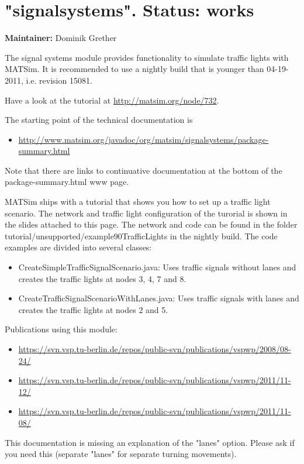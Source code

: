 \vfill\eject
\section{"signalsystems". Status: works}

\textbf{Maintainer:} Dominik Grether

The signal systems module provides functionality to simulate traffic  lights with MATSim. It is recommended to use a nightly build that is  younger than 04-19-2011, i.e. revision 15081.

Have a look at the tutorial at \href{http://matsim.org/node/732}{http://matsim.org/node/732}.

The starting point of the technical documentation is
\begin{itemize}
	\item \href{http://www.matsim.org/javadoc/org/matsim/signalsystems/package-summary.html}{http://www.matsim.org/javadoc/org/matsim/signalsystems/package-summary.html}
\end{itemize}

Note that there are links to continuative documentation at the bottom of the package-summary.html www page.

MATSim ships with a tutorial that shows you how to set up a traffic  light scenario. The network and traffic light configuration of the  turorial is shown in the slides attached to this page. The network and  code can be found in the folder  tutorial/unsupported/example90TrafficLights in the nightly build. The  code examples are divided into several classes:
\begin{itemize}
	\item CreateSimpleTrafficSignalScenario.java: Uses traffic signals  without lanes and creates the traffic lights at nodes 3, 4, 7 and 8.
	\item CreateTrafficSignalScenarioWithLanes.java: Uses traffic signals with lanes and creates the traffic lights at nodes 2 and 5.
\end{itemize}



Publications using this module:
\begin{itemize}
	\item \href{https://svn.vsp.tu-berlin.de/repos/public-svn/publications/vspwp/2008/08-24/}{https://svn.vsp.tu-berlin.de/repos/public-svn/publications/vspwp/2008/08-24/}
	\item \href{https://svn.vsp.tu-berlin.de/repos/public-svn/publications/vspwp/2011/11-12/}{https://svn.vsp.tu-berlin.de/repos/public-svn/publications/vspwp/2011/11-12/}
	\item \href{https://svn.vsp.tu-berlin.de/repos/public-svn/publications/vspwp/2011/11-08/}{https://svn.vsp.tu-berlin.de/repos/public-svn/publications/vspwp/2011/11-08/}
\end{itemize}This documentation is missing an  explanation of the "lanes" option. Please ask if you need this  (separate "lanes" for separate turning movements).



